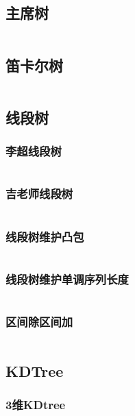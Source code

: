 \documentclass{article}
\begin{document}
\subsection{主席树}
\inputminted[breaklines]{c++}{../数据结构/主席树.cpp}

\subsection{笛卡尔树}
\inputminted[breaklines]{c++}{../数据结构/笛卡尔树.cpp}

\subsection{线段树}
\subsubsection{李超线段树}
\inputminted[breaklines]{c++}{../数据结构/李超线段树.cpp}

\subsubsection{吉老师线段树}
\inputminted[breaklines]{c++}{../数据结构/吉老师线段树.cpp}

\subsubsection{线段树维护凸包}
\inputminted[breaklines]{c++}{../数据结构/线段树维护凸包.cpp}

\subsubsection{线段树维护单调序列长度}
\inputminted[breaklines]{c++}{../数据结构/线段树维护单调序列长度.cpp}

\subsubsection{区间除区间加}
\inputminted[breaklines]{c++}{../数据结构/区间除区间加.cpp}

\subsection{KDTree}
\subsubsection{3维KDtree}
\inputminted[breaklines]{c++}{../数据结构/3维KDtree.cpp}
\end{document}
